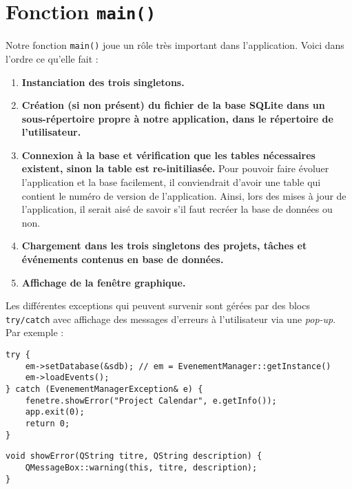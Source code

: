 \section{Fonction \lstinline{main()}}
Notre fonction \lstinline{main()} joue un rôle très important dans l'application. Voici dans l'ordre ce qu'elle fait :
\begin{enumerate}
  \item \textbf{Instanciation des trois singletons.}
  \item \textbf{Création (si non présent) du fichier de la base SQLite dans un sous-répertoire propre à notre application, dans le répertoire de l'utilisateur.}
  \item \textbf{Connexion à la base et vérification que les tables nécessaires existent, sinon la table est \og re-initiliasée\fg{}.} Pour pouvoir faire évoluer l'application et la base facilement, il conviendrait d'avoir une table qui contient le numéro de version de l'application. Ainsi, lors des mises à jour de l'application, il serait aisé de savoir s'il faut recréer la base de données ou non.
  \item \textbf{Chargement dans les trois singletons des projets, tâches et événements contenus en base de données.}
  \item \textbf{Affichage de la fenêtre graphique.}
\end{enumerate}

\bigskip

Les différentes exceptions qui peuvent survenir sont gérées par des blocs \lstinline{try/catch} avec affichage des messages d'erreurs à l'utilisateur via une \textit{pop-up}. Par exemple :

\begin{lstlisting}
try {
    em->setDatabase(&sdb); // em = EvenementManager::getInstance()
    em->loadEvents();
} catch (EvenementManagerException& e) {
    fenetre.showError("Project Calendar", e.getInfo());
    app.exit(0);
    return 0;
}
\end{lstlisting}
\begin{lstlisting}
void showError(QString titre, QString description) {
    QMessageBox::warning(this, titre, description);
}
\end{lstlisting}